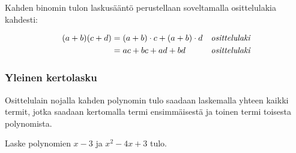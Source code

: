 Kahden binomin tulon laskusääntö perustellaan soveltamalla osittelulakia kahdesti:


\begin{align*}
(a+b)(c+d) &= (a+b)\cdot c + (a+b)\cdot d &\emph{osittelulaki} \\
 &= ac+bc+ad+bd &\emph{osittelulaki} 
\end{align*}


\subsubsection*{Yleinen kertolasku}

Osittelulain nojalla kahden polynomin tulo saadaan laskemalla yhteen kaikki
termit, jotka saadaan kertomalla termi ensimmäisestä ja toinen termi toisesta
polynomista.



\begin{esimerkki}
Laske polynomien $x-3$ ja $x^2-4x+3$ tulo. \\
\newline
\end{esimerkki}

